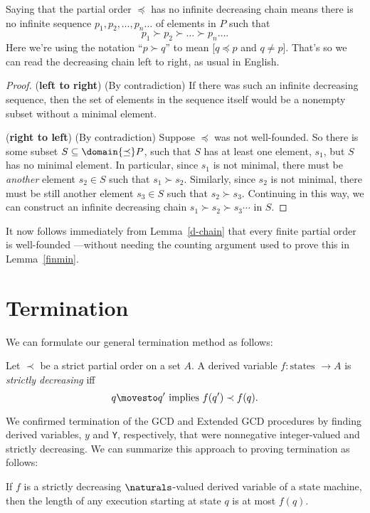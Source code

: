 Saying that the partial order $\preceq$ has no infinite decreasing chain
means there is no infinite sequence $p_1,p_2,\dots,p_n\dots$ of elements
in $P$ such that
\[
p_1 \succ p_2 \succ \dots \succ p_n \dots.
\]
Here we're using the notation ``$p \succ q$'' to mean [$q \preceq p$ and
  $q \neq p$].  That's so we can read the decreasing chain left to right,
as usual in English.

\begin{proof}
(\textbf{left to right}) (By contradiction) If there was such an infinite
decreasing sequence, then the set of elements in the sequence itself would
be a nonempty subset without a minimal element.

(\textbf{right to left}) (By contradiction) Suppose $\preceq$ was not
well-founded.  So there is some subset $S \subseteq \domain{\preceq}P$,
such that $S$ has at least one element, $s_1$, but $S$ has no minimal
element.  In particular, since $s_1$ is not minimal, there must be
\emph{another} element $s_2 \in S$ such that $s_1 \succ s_2$.  Similarly,
since $s_2$ is not minimal, there must be still another element $s_3 \in S$
such that $s_2 \succ s_3$.  Continuing in this way, we can construct an
infinite decreasing chain $s_1 \succ s_2 \succ s_3 \cdots$ in $S$.
\end{proof}

It now follows immediately from Lemma~\ref{d-chain} that every finite
partial order is well-founded ---without needing the counting argument
used to prove this in Lemma~\ref{finmin}.

\begin{problems}
\practiceproblems
{}
\end{problems}


\section{Termination}

We can formulate our general termination method as follows:

\begin{definition}
  Let $\prec$ be a strict partial order on a set $A$.  A derived variable
  $f : \text{states } \to A$ is \emph{strictly decreasing} iff
\[
q \movesto q' \text{  implies  } f(q') \prec f(q).
\]
\end{definition}

We confirmed termination of the GCD and Extended GCD procedures by finding
derived variables, $y$ and \texttt{Y}, respectively, that were nonnegative
integer-valued and strictly decreasing.  We can summarize this approach to
proving termination as follows:
\begin{theorem}
\label{th:decr}
If $f$ is a strictly decreasing $\naturals$-valued derived variable of a
state machine, then the length of any execution starting at state $q$ is
at most $f(q)$.
\end{theorem}


